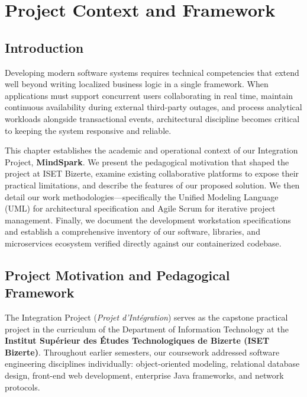 \chapter{Project Context and Framework}
\label{chap:project_context}

\section{Introduction}
\label{sec:ch1_intro}

Developing modern software systems requires technical competencies that extend well beyond writing localized business logic in a single framework. When applications must support concurrent users collaborating in real time, maintain continuous availability during external third-party outages, and process analytical workloads alongside transactional events, architectural discipline becomes critical to keeping the system responsive and reliable.

This chapter establishes the academic and operational context of our Integration Project, \textbf{MindSpark}. We present the pedagogical motivation that shaped the project at ISET Bizerte, examine existing collaborative platforms to expose their practical limitations, and describe the features of our proposed solution. We then detail our work methodologies---specifically the Unified Modeling Language (UML) for architectural specification and Agile Scrum for iterative project management. Finally, we document the development workstation specifications and establish a comprehensive inventory of our software, libraries, and microservices ecosystem verified directly against our containerized codebase.

\section{Project Motivation and Pedagogical Framework}
\label{sec:motivation_framework}

The Integration Project (\textit{Projet d'Intégration}) serves as the capstone practical project in the curriculum of the Department of Information Technology at the \textbf{Institut Supérieur des Études Technologiques de Bizerte (ISET Bizerte)}. Throughout earlier semesters, our coursework addressed software engineering disciplines individually: object-oriented modeling, relational database design, front-end web development, enterprise Java frameworks, and network protocols.

